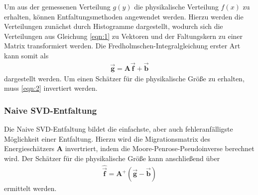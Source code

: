 Um aus der gemessenen Verteilung $g(y)$ die physikalische Verteilung $f(x)$ zu erhalten, können Entfaltungsmethoden angewendet werden.
Hierzu werden die Verteilungen zunächst durch Histogramme dargestellt, wodurch sich die Verteilungen aus Gleichung \eqref{eqn:1} zu Vektoren und der Faltungskern zu einer Matrix transformiert werden. Die Fredholmschen-Integralgleichung erster Art kann somit als 
\begin{align}
	\vec{\pmb{g}} = \pmb{A}\vec{\pmb{f}} + \vec{\pmb{b}}
	\label{eqn:2}
\end{align}
dargestellt werden.
Um einen Schätzer für die physikalische Größe zu erhalten, muss \eqref{eqn:2} invertiert werden. 


\subsubsection{Naive SVD-Entfaltung}
Die Naive SVD-Entfaltung bildet die einfachste, aber auch fehleranfälligste Möglichkeit einer Entfaltung. 
Hierzu wird die Migrationsmatrix des Energieschätzers $\pmb{A}$ invertriert, indem die Moore-Penrose-Pseudoinverse berechnet wird. Der Schätzer für die physikalische Größe kann anschließend über
\begin{align}
	\hat{\vec{\pmb{f}}} = \pmb{A}^{+}(\vec{\pmb{g}} - \vec{\pmb{b}})
	\label{eqn:NSVD}
\end{align}
ermittelt werden.

